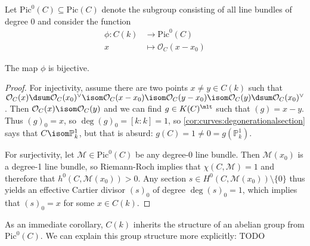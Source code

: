 \documentclass[wip, algebra]{bsteffan-lecturenotes}
\newcommand{\cO}{\mathcal{O}}
\newcommand{\cM}{\mathcal{M}}
\renewcommand{\P}{\mathbb{P}}
\newcommand{\Pic}{\mathrm{Pic}}
\begin{document}
Let $\Pic^0(C) \subseteq \Pic(C)$ denote the subgroup consisting of all line bundles of degree 0 and consider the function
\begin{align*}
	\phi\colon C(k) &\to \Pic^0(C) \\
	x &\mapsto \cO_C(x - x_0)
\end{align*}
\begin{proposition}
	The map $\phi$ is bijective.
\end{proposition}
\begin{proof}
	For injectivity, assume there are two points $x \neq y \in C(k)$ such that $\cO_C(x) \dsum \cO_C(x_0)^\vee \isom \cO_C(x - x_0) \isom \cO_C(y - x_0) \isom \cO_C(y) \dsum \cO_C(x_0)^\vee$.
	Then $\cO_C(x) \isom \cO_C(y)$ and we can find $g \in K(C)^\mlt$ such that $(g) = x - y$.
	Thus $(g)_0 = x$, so $\deg (g)_0 = [k : k] = 1$, so \cref{cor:curves:degonerationalsection} says that $C \isom \P^1_k$, but that is absurd: $g(C) = 1 \neq 0 = g(\P^1_k)$.

	For surjectivity, let $\cM \in \Pic^0(C)$ be any degree-0 line bundle.
	Then $\cM(x_0)$ is a degree-1 line bundle, so Riemann-Roch implies that $\chi(C, \cM) = 1$ and therefore that $h^0(C, \cM(x_0)) > 0$.
	Any section $s \in H^0(C, \cM(x_0)) \setminus \{0\}$ thus yields an effective Cartier divisor $(s)_0$ of degree $\deg (s)_0 = 1$, which implies that $(s)_0 = x$ for some $x \in C(k)$.
\end{proof}
As an immediate corollary, $C(k)$ inherits the structure of an abelian group from $\Pic^0(C)$.
We can explain this group structure more explicitly:
TODO

\printindex
\printbibliography
\end{document}
